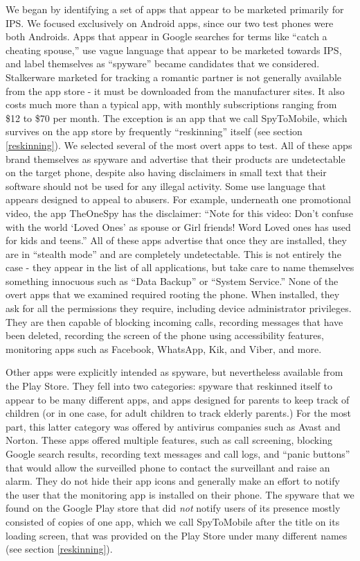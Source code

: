 \documentclass[acmtog]{acmart}
\begin{document}
We began by identifying a set of apps that appear to be 
marketed primarily for IPS. We focused exclusively on Android apps, since our 
two test phones were both Androids. Apps that appear in Google searches for 
terms like ``catch a cheating spouse,'' use vague language that appear to be 
marketed towards IPS, and label themselves as ``spyware'' became candidates 
that we considered. Stalkerware marketed for tracking a romantic partner is not 
generally available from the app store - it must be downloaded from the 
manufacturer sites. It also costs much more than a typical app, with monthly 
subscriptions ranging from \$12 to \$70 per month. The exception is an app that 
we call SpyToMobile, which survives on the app store by frequently 
``reskinning'' itself (see section \ref{reskinning}).  
We selected several of the most overt apps to test. All of these apps brand 
themselves 
as spyware and advertise that their products are undetectable on the target 
phone, despite also having disclaimers in small text that their software should 
not be used for any illegal activity. Some use language that appears designed 
to appeal to abusers. For example, underneath one promotional 
video, the app TheOneSpy has the disclaimer: ``Note for this video: Don't 
confuse with the world `Loved Ones' as spouse or Girl friends! Word Loved ones 
has used for kids and teens.''\cite{noauthor_theonespy_2013} All of these apps 
advertise that once they are installed, they are in ``stealth mode'' and are 
completely undetectable. This is not entirely the case - they appear in the 
list of all applications, but take care to name themselves something innocuous 
such as ``Data Backup'' or ``System Service.'' None of the overt apps that we 
examined required rooting the phone. When installed, they ask for all the 
permissions they 
require, including device administrator privileges. They are then capable of 
blocking incoming calls, recording messages that have been deleted, recording 
the screen of the phone using accessibility features, monitoring apps such as 
Facebook, WhatsApp, Kik, and Viber, and more.

Other apps were explicitly intended as spyware, but nevertheless available from 
the Play Store. They fell into two categories: spyware that reskinned itself to 
appear to be many different apps, and apps designed for parents to keep track 
of children (or in one case, for adult children to track elderly parents.) For 
the most part, this latter category was offered by antivirus companies such as 
Avast and Norton. These apps offered 
multiple features, such as call screening, blocking Google search results, 
recording text messages and call logs, and ``panic buttons'' that would allow 
the surveilled phone to contact the surveillant and raise an alarm. They do not 
hide their app icons and generally make an effort to notify the user that the 
monitoring app is installed on their phone. The spyware that we found on the 
Google Play store that did \textit{not} notify users of its presence mostly 
consisted of copies of one app, which we call SpyToMobile after the title on 
its loading screen, 
that was provided on the Play Store under many different names (see section 
\ref{reskinning}). 
\end{document}
